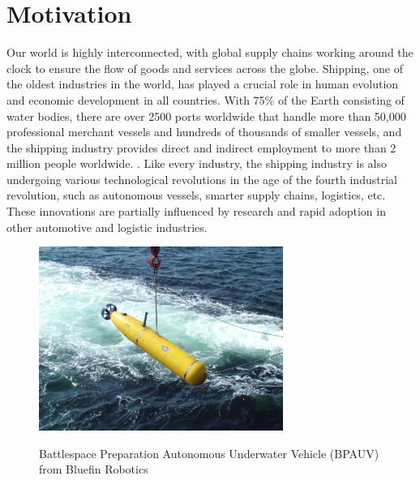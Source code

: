 \section{Motivation}
Our world is highly interconnected, with global supply chains working around the clock to ensure the flow of goods and services across the globe. Shipping, one of the oldest industries in the world, has played a crucial role in human evolution and economic development in all countries. With 75\% of the Earth consisting of water bodies, there are over 2500 ports worldwide that handle more than 50,000 professional merchant vessels and hundreds of thousands of smaller vessels, and the shipping industry provides direct and indirect employment to more than 2 million people worldwide. \cite{donepudi2014technology}. Like every industry, the shipping industry is also undergoing various technological revolutions in the age of the fourth industrial revolution, such as autonomous vessels, smarter supply chains, logistics, etc. These innovations are partially influenced by research and rapid adoption in other automotive and logistic industries.
\begin{figure}[H]
    \centering
    \includegraphics[width=\textwidth,height=6cm,keepaspectratio=true]{src/Images/BPAUV-MP_from_HSV-.jpg}
    \caption{Battlespace Preparation Autonomous Underwater Vehicle (BPAUV) from Bluefin Robotics}\cite{auv_img}
\end{figure}
\\

